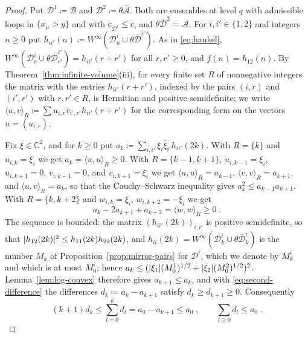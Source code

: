 \documentclass[11pt]{preprint}
\DeclarePairedDelimiter{\abs}{\lvert}{\rvert}
\numberwithin{equation}{section}
\theoremstyle{definition}
\theoremstyle{remark}
\theoremstyle{plain}
\begin{document}
\begin{proof}
Put $\mathcal D^1 \coloneqq \mathcal B$ and $\mathcal D^2 \coloneqq \theta\bar{\mathcal A}$. Both are ensembles at level $q$ with admissible loops in $\{ x_\mu > y \}$ and with $c_{\mathcal D^i} \leq c$, and $\theta\bar{\mathcal D}^2 = \mathcal A$. For $i, i' \in \{ 1, 2 \}$ and integers $n \geq 0$ put $h_{ii'}(n) \coloneqq W^\infty(\mathcal D^i_n \cup \theta\bar{\mathcal D}^{i'})$. As in \eqref{eq:hankel}, $W^\infty(\mathcal D^i_r \cup \theta\bar{\mathcal D}^{i'}_{r'}) = h_{ii'}(r + r')$ for all $r, r' \geq 0$, and $f(n) = h_{12}(n)$. By Theorem~\ref{thm:infinite-volume}(iii), for every finite set $R$ of nonnegative integers the matrix with the entries $h_{ii'}(r + r')$, indexed by the pairs $(i, r)$ and $(i', r')$ with $r, r' \in R$, is Hermitian and positive semidefinite; we write $\langle u, v\rangle_R \coloneqq \sum u_{i,r}\bar v_{i',r'}h_{ii'}(r + r')$ for the corresponding form on the vectors $u = (u_{i,r})$.

Fix $\xi \in \mathbb C^2$, and for $k \geq 0$ put $a_k \coloneqq \sum_{i,i'}\xi_i\bar\xi_{i'}h_{ii'}(2k)$. With $R = \{ k \}$ and $u_{i,k} = \xi_i$ we get $a_k = \langle u, u\rangle_R \geq 0$. With $R = \{ k - 1, k + 1 \}$, $u_{i,k-1} = \xi_i$, $u_{i,k+1} = 0$, $v_{i,k-1} = 0$, and $v_{i,k+1} = \xi_i$ we get $\langle u, u\rangle_R = a_{k-1}$, $\langle v, v\rangle_R = a_{k+1}$, and $\langle u, v\rangle_R = a_k$, so that the Cauchy--Schwarz inequality gives $a_k^2 \leq a_{k-1}a_{k+1}$. With $R = \{ k, k + 2 \}$ and $w_{i,k} = \xi_i$, $w_{i,k+2} = -\xi_i$ we get
\begin{equation}\label{eq:second-difference}
    a_k - 2a_{k+1} + a_{k+2} = \langle w, w\rangle_R \geq 0\;.
\end{equation}
The sequence is bounded: the matrix $(h_{ii'}(2k))_{i,i'}$ is positive semidefinite, so that $\abs{h_{12}(2k)}^2 \leq h_{11}(2k)h_{22}(2k)$, and $h_{ii}(2k) = W^\infty(\mathcal D^i_k \cup \theta\bar{\mathcal D}^i_k)$ is the number $M_k$ of Proposition~\ref{prop:mirror-pairs} for $\mathcal D^i$, which we denote by $M^i_k$ and which is at most $M^i_0$; hence $a_k \leq (\abs{\xi_1}(M^1_0)^{1/2} + \abs{\xi_2}(M^2_0)^{1/2})^2$. Lemma~\ref{lem:log-convex} therefore gives $a_{k+1} \leq a_k$, and with \eqref{eq:second-difference} the differences $d_k \coloneqq a_k - a_{k+1}$ satisfy $d_k \geq d_{k+1} \geq 0$. Consequently
\begin{equation}\label{eq:difference-sums}
    (k + 1)d_k \leq \sum_{l=0}^{k}d_l = a_0 - a_{k+1} \leq a_0\;,
    \qquad
    \sum_{l \geq 0}d_l \leq a_0\;.
\end{equation}


\end{proof}
\end{document}
